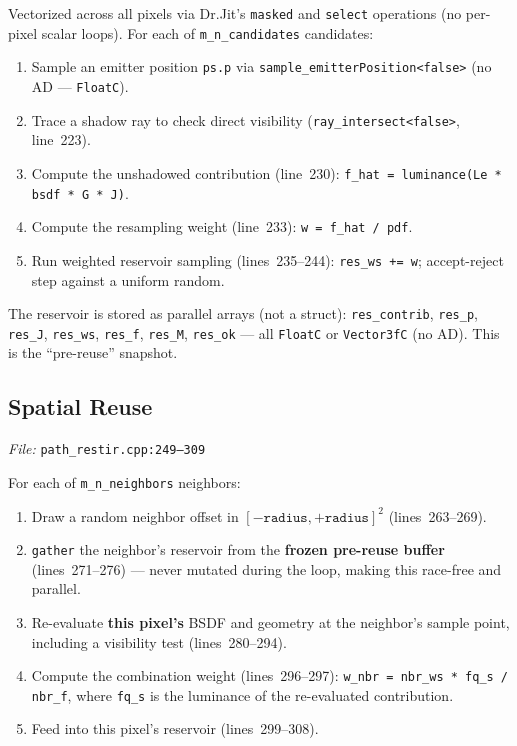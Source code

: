 Vectorized across all pixels via Dr.Jit's \texttt{masked} and \texttt{select}
operations (no per-pixel scalar loops). For each of \texttt{m\_n\_candidates}
candidates:

\begin{enumerate}
    \item Sample an emitter position \texttt{ps.p} via
        \texttt{sample\_emitter\-Position<false>} (no AD --- \texttt{FloatC}).
    \item Trace a shadow ray to check direct visibility
        (\texttt{ray\_intersect<false>}, line~223).
    \item Compute the unshadowed contribution (line~230):
        \texttt{f\_hat = luminance(Le * bsdf * G * J)}.
    \item Compute the resampling weight (line~233):
        \texttt{w = f\_hat / pdf}.
    \item Run weighted reservoir sampling (lines~235--244):
        \texttt{res\_ws += w}; accept-reject step against a uniform random.
\end{enumerate}

The reservoir is stored as parallel arrays (not a struct):
\texttt{res\_contrib}, \texttt{res\_p}, \texttt{res\_J}, \texttt{res\_ws},
\texttt{res\_f}, \texttt{res\_M}, \texttt{res\_ok} --- all \texttt{FloatC} or
\-\texttt{Vector3fC} (no AD). This is the ``pre-reuse'' snapshot.

\subsection{Spatial Reuse}
\label{sec:spatial}

\emph{File:} \texttt{path\_restir.cpp:249--309}

For each of \texttt{m\_n\_neighbors} neighbors:

\begin{enumerate}
    \item Draw a random neighbor offset in $[-\texttt{radius}, +\texttt{radius}]^2$
        (lines~263--269).
    \item \texttt{gather} the neighbor's reservoir from the \textbf{frozen
        pre-reuse buffer} (lines~271--276) --- never mutated during the loop,
        making this race-free and parallel.
    \item Re-evaluate \textbf{this pixel's} BSDF and geometry at the
        neighbor's sample point, including a visibility test (lines~280--294).
    \item Compute the combination weight (lines~296--297):
        \texttt{w\_nbr = nbr\_ws * fq\_s / nbr\_f}, where \texttt{fq\_s} is
        the luminance of the re-evaluated contribution.
    \item Feed into this pixel's reservoir (lines~299--308).
\end{enumerate}

